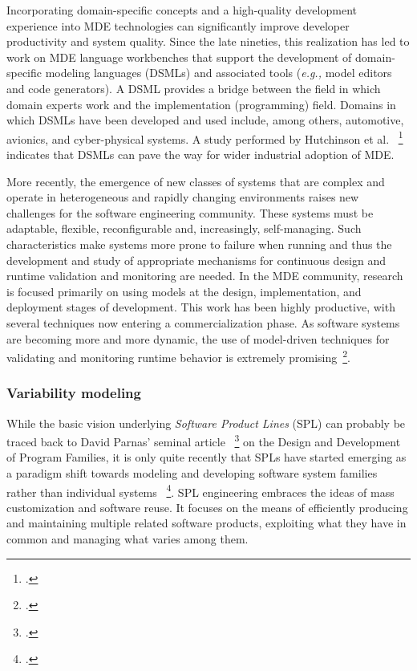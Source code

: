 Incorporating domain-specific concepts and a high-quality development experience into MDE technologies can significantly improve developer productivity and system quality. Since the late nineties, this realization has led to work on MDE language workbenches that support the development of domain-specific modeling languages (DSMLs) and associated tools (\emph{e.g.,} model editors and code generators). A DSML provides a bridge between the field in which domain experts work and the implementation (programming) field. Domains in which DSMLs have been developed and used include, among others, automotive, avionics, and cyber-physical systems. A study performed by Hutchinson et al.~ \footcite{Hutchinson11} indicates that DSMLs can pave the way for wider industrial adoption of MDE.

More recently, the emergence of new classes of systems that are complex and  operate in heterogeneous and rapidly changing environments raises new challenges for the software engineering community. These systems must be adaptable, flexible, reconfigurable and, increasingly, self-managing. Such characteristics make systems more prone to failure when running and thus the development and study of appropriate mechanisms for continuous design and runtime validation and monitoring are needed. In the MDE community, research is focused primarily on using models at the design, implementation, and deployment stages of development. This work has been highly productive, with several techniques now entering a commercialization phase. As software systems are becoming more and more dynamic, the use of model-driven techniques for validating and monitoring runtime behavior is extremely promising~\footcite{Morin09f}.

\subsubsection{Variability modeling}
\label{sec:variability}
While the basic vision underlying \textit{Software Product Lines} (SPL) can
probably be traced back to David Parnas' seminal article~ \footcite{parnas1976} on
the Design and Development of Program Families, it is only quite recently that
SPLs have started emerging as a paradigm shift towards modeling and developing
software system families rather than individual
systems~ \footcite{Northrop1999a}. SPL engineering embraces the ideas of mass
customization and software reuse. It focuses on the means of efficiently
producing and maintaining multiple related software products, exploiting what
they have in common and managing what varies among them.

